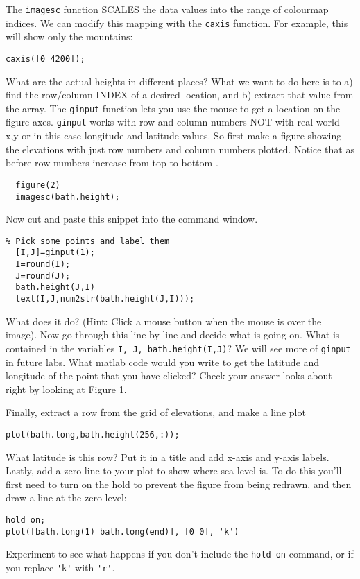 \documentclass[letterpaper,10pt]{article}
\begin{document}
The \verb+imagesc+ function SCALES the data values into the range of colourmap indices.
We can modify this mapping with the \verb+caxis+ function. For example, this will
show only the mountains:
\begin{verbatim}
caxis([0 4200]);
\end{verbatim}

What are the actual heights in different places? What we want to do here is to a)
find the row/column INDEX of a desired location, and b) extract that value from
the array. The \verb+ginput+ function lets you use the mouse to get a location on
the figure axes.  \verb+ginput+ works with row and column numbers NOT with real-world x,y or in this 
case longitude and latitude values.  So first make a figure showing the elevations with just row numbers and column numbers plotted.
Notice that as before row numbers increase from top to bottom .

\begin{verbatim}
  figure(2)
  imagesc(bath.height);
\end{verbatim}

Now cut and paste this snippet into the command window.

\begin{verbatim}
% Pick some points and label them   
  [I,J]=ginput(1);
  I=round(I);
  J=round(J);
  bath.height(J,I)
  text(I,J,num2str(bath.height(J,I)));
\end{verbatim}
  
What does it do? (Hint: Click a mouse button when the mouse
is over the image). Now go through this line by line and decide what is going on.  What is contained in the variables \verb+I, J, bath.height(I,J)+? We will see more of \verb+ginput+ in future labs. What matlab code would you write to get the latitude and longitude of the point that you have clicked?  Check your answer looks about right by looking at Figure 1.  


Finally, extract a row from the grid of elevations, and make a line plot
\begin{verbatim}
plot(bath.long,bath.height(256,:));
\end{verbatim}
What latitude is this row? Put it in a title and add x-axis and y-axis labels. Lastly, add a zero line to your plot to show where sea-level is. To do this you'll first need to turn on the hold to prevent the figure from being redrawn, and then draw a line at the zero-level:
\begin{verbatim}
hold on;
plot([bath.long(1) bath.long(end)], [0 0], 'k')
\end{verbatim}
Experiment to see what happens if you don't include the \verb:hold on: command, or if you replace \verb:'k': with \verb:'r':.
\end{document}
